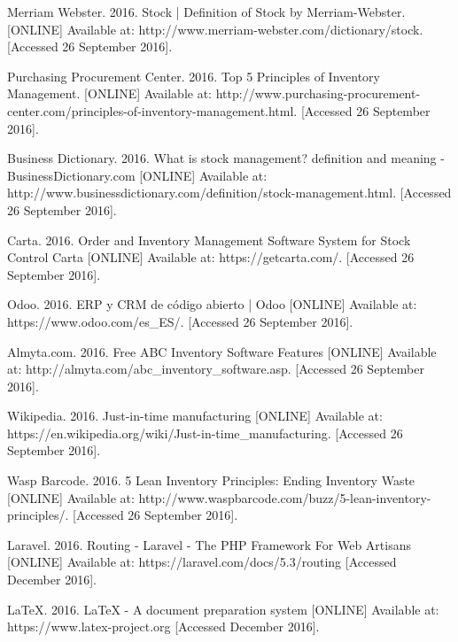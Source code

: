 \begin{thebibliography}{9}

Merriam Webster. 2016. Stock | Definition of Stock by Merriam-Webster. [ONLINE] Available at: http://www.merriam-webster.com/dictionary/stock. [Accessed 26 September 2016].

Purchasing Procurement Center. 2016. Top 5 Principles of Inventory Management. [ONLINE] Available at: http://www.purchasing-procurement-center.com/principles-of-inventory-management.html. [Accessed 26 September 2016].

Business Dictionary. 2016. What is stock management? definition and meaning - BusinessDictionary.com [ONLINE] Available at: http://www.businessdictionary.com/definition/stock-management.html. [Accessed 26 September 2016].

Carta. 2016. Order and Inventory Management Software System for Stock Control Carta [ONLINE] Available at: https://getcarta.com/. [Accessed 26 September 2016].

Odoo. 2016. ERP y CRM de código abierto | Odoo [ONLINE] Available at: https://www.odoo.com/es\_ES/. [Accessed 26 September 2016].

Almyta.com. 2016. Free ABC Inventory Software Features [ONLINE] Available at: http://almyta.com/abc\_inventory\_software.asp. [Accessed 26 September 2016].

Wikipedia. 2016. Just-in-time manufacturing [ONLINE] Available at: https://en.wikipedia.org/wiki/Just-in-time\_manufacturing. [Accessed 26 September 2016].

Wasp Barcode. 2016. 5 Lean Inventory Principles: Ending Inventory Waste [ONLINE] Available at: http://www.waspbarcode.com/buzz/5-lean-inventory-principles/. [Accessed 26 September 2016].

Laravel. 2016. Routing - Laravel - The PHP Framework For Web Artisans [ONLINE] Available at: https://laravel.com/docs/5.3/routing [Accessed December 2016].

LaTeX. 2016. LaTeX - A document preparation system [ONLINE] Available at: https://www.latex-project.org [Accessed December 2016].

\end{thebibliography}